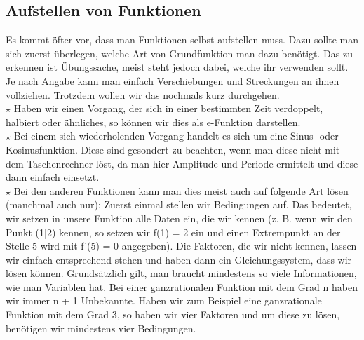 \subsection{Aufstellen von Funktionen}
	Es kommt öfter vor, dass man Funktionen selbst aufstellen muss. Dazu sollte man
	sich zuerst überlegen, welche Art von Grundfunktion man dazu benötigt. Das zu
	erkennen ist Übungssache, meist steht jedoch dabei, welche ihr verwenden sollt.
	Je nach Angabe kann man einfach Verschiebungen und Streckungen an ihnen
	vollziehen. Trotzdem wollen wir das nochmals kurz durchgehen.\\

	\(\star\) Haben wir einen Vorgang, der sich in einer bestimmten Zeit
	verdoppelt, halbiert oder ähnliches, so können wir dies als e-Funktion
	darstellen.\\

	\(\star\) Bei einem sich wiederholenden Vorgang handelt es sich um eine Sinus-
	oder Kosinusfunktion. Diese sind gesondert zu beachten, wenn man diese nicht
	mit dem Taschenrechner löst, da man hier Amplitude und Periode ermittelt und
	diese dann einfach einsetzt.\\

	\(\star\) Bei den anderen Funktionen kann man dies meist auch auf folgende Art
	lösen (manchmal auch nur): Zuerst einmal stellen wir Bedingungen auf. Das
	bedeutet, wir setzen in unsere Funktion alle Daten ein, die wir kennen (z. B.
	wenn wir den Punkt (1|2) kennen, so setzen wir f(1) = 2 ein und einen Extrempunkt an der Stelle 5 wird mit f'(5) = 0 angegeben). Die Faktoren, die
	wir nicht kennen, lassen wir einfach entsprechend stehen und haben dann ein
	Gleichungssystem, dass wir lösen können. Grundsätzlich gilt, man braucht
	mindestens so viele Informationen, wie man Variablen hat. Bei einer
	ganzrationalen Funktion mit dem Grad n haben wir immer n + 1 Unbekannte. Haben
	wir zum Beispiel eine ganzrationale Funktion mit dem Grad 3, so haben wir vier
	Faktoren und um diese zu lösen, benötigen wir mindestens vier Bedingungen.
